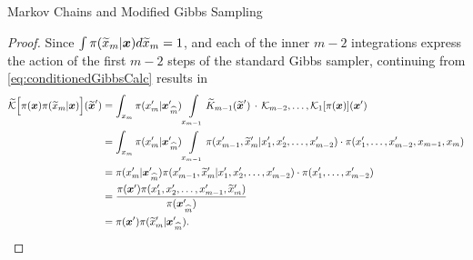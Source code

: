 \begin{chapter}{Markov Chains and Modified Gibbs Sampling}
\begin{proof}
  Since  $\int\pi(\widetilde x_m|\mbox{\boldmath$x$})d\widetilde x_m = 1$, and each of the inner $m-2$ integrations express the action of the first $m-2$ steps of the standard Gibbs sampler, continuing from \eqref{eq:conditionedGibbsCalc} results in 
  \begin{align}
    \widetilde{\mathcal K}\Big[ \pi(\mbox{\boldmath$x$})\pi(\widetilde x_m|\mbox{\boldmath$x$})\Big](\widetilde{\mbox{\boldmath$x$}}')
      &= \int_{x_m}\pi(x_m'|\mbox{\boldmath$x$}_{\,\widehat{m}}') \int\limits_{x_{m-1}}\widetilde K_{m-1}(\widetilde{\mbox{\boldmath$x$}}')\,\cdot\,\mathcal K_{m-2},\dots,\mathcal K_{1}[\pi(\mbox{\boldmath$x$})](\mbox{\boldmath$x$}')\nonumber \\ 
      &= \int_{x_m}\pi(x_m'|\mbox{\boldmath$x$}_{\,\widehat{m}}') \int\limits_{x_{m-1}}\pi(x_{m-1}',\widetilde x_m'|x_1',x_2',\dots, x_{m-2}')\cdot\pi(x_1',\dots, x_{m-2}', x_{m-1},x_m)\nonumber \\ 
      &= \pi(x_m'|\mbox{\boldmath$x$}_{\,\widehat{m}}') \pi(x_{m-1}',\widetilde x_m'|x_1',x_2',\dots, x_{m-2}')\cdot\pi(x_1',\dots, x_{m-2}')\nonumber \\ 
      &= \frac{\pi(\mbox{\boldmath$x$}')\pi(x_1',x_2',\dots, x_{m-1}', \widetilde x_m')}{\pi(\mbox{\boldmath$x$}_{\,\widehat{m}}')}\nonumber \\ 
      &= \pi(\mbox{\boldmath$x$}')\pi(\widetilde x_m'|\mbox{\boldmath$x$}_{\,\widehat{m}}').
  \end{align}

\end{proof}
\end{chapter}
